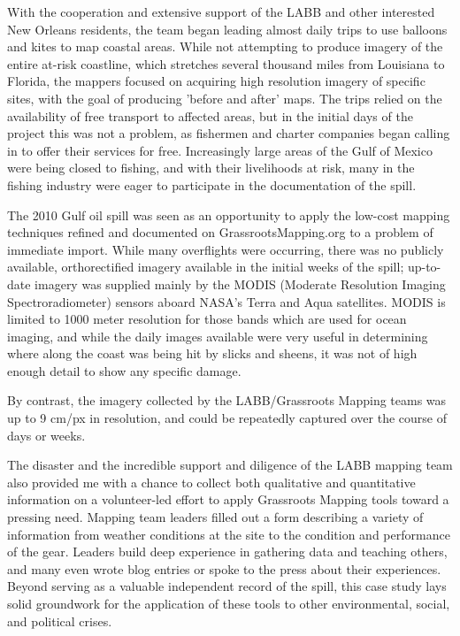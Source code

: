 \documentclass[11pt]{report}
\begin{document}
With the cooperation and extensive support of the LABB and other interested New Orleans residents, the team began leading almost daily trips to use balloons and kites to map coastal areas. While not attempting to produce imagery of the entire at-risk coastline, which stretches several thousand miles from Louisiana to Florida, the mappers focused on acquiring high resolution imagery of specific sites, with the goal of producing 'before and after' maps. The trips relied on the availability of free transport to affected areas, but in the initial days of the project this was not a problem, as fishermen and charter companies began calling in to offer their services for free. Increasingly large areas of the Gulf of Mexico were being closed to fishing, and with their livelihoods at risk, many in the fishing industry were eager to participate in the documentation of the spill. 


The 2010 Gulf oil spill was seen as an opportunity to apply the low-cost mapping techniques refined and documented on GrassrootsMapping.org to a problem of immediate import. While many overflights were occurring, there was no publicly available, orthorectified imagery available in the initial weeks of the spill; up-to-date imagery was supplied mainly by the MODIS (Moderate Resolution Imaging Spectroradiometer) sensors aboard NASA's Terra and Aqua satellites. MODIS is limited to 1000 meter resolution for those bands which are used for ocean imaging, and while the daily images available were very useful in determining where along the coast was being hit by slicks and sheens, it was not of high enough detail to show any specific damage. 


By contrast, the imagery collected by the LABB/Grassroots Mapping teams was up to 9 cm/px in resolution, and could be repeatedly captured over the course of days or weeks.  

The disaster and the incredible support and diligence of the LABB mapping team also provided me with a chance to collect both qualitative and quantitative information on a volunteer-led effort to apply Grassroots Mapping tools toward a pressing need. Mapping team leaders filled out a form describing a variety of information from weather conditions at the site to the condition and performance of the gear. Leaders build deep experience in gathering data and teaching others, and many even wrote blog entries or spoke to the press about their experiences. Beyond serving as a valuable independent record of the spill, this case study lays solid groundwork for the application of these tools to other environmental, social, and political crises.
\end{document}
